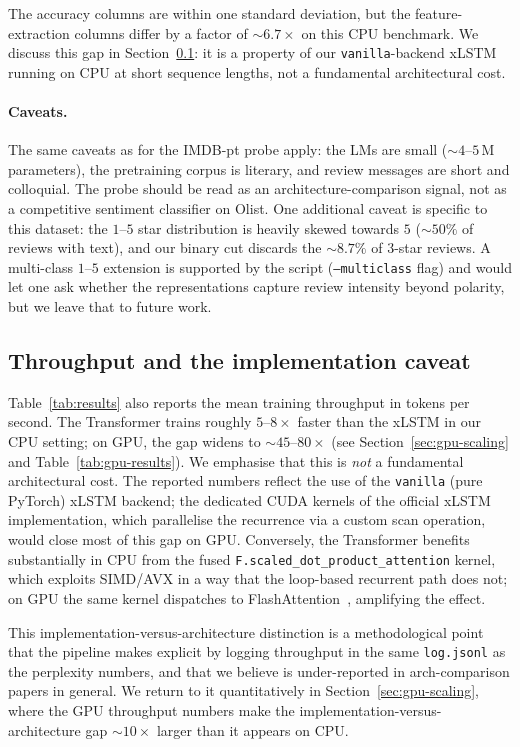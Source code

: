 \documentclass[11pt]{article}
\begin{document}
The accuracy columns are within one standard deviation, but the
feature-extraction columns differ by a factor of $\sim$$6.7\times$ on
this CPU benchmark. We discuss this gap in
Section~\ref{sec:throughput}: it is a property of our
\texttt{vanilla}-backend xLSTM running on CPU at short sequence
lengths, not a fundamental architectural cost.

\paragraph{Caveats.}
The same caveats as for the IMDB-pt probe apply: the LMs are small
($\sim$$4$--$5$\,M parameters), the pretraining corpus is literary,
and review messages are short and colloquial. The probe should be
read as an architecture-comparison signal, not as a competitive
sentiment classifier on Olist. One additional caveat is specific to
this dataset: the $1$--$5$ star distribution is heavily skewed
towards $5$ ($\sim$$50\%$ of reviews with text), and our binary cut
discards the $\sim$$8.7\%$ of $3$-star reviews. A multi-class
$1$--$5$ extension is supported by the script (\texttt{--multiclass}
flag) and would let one ask whether the representations capture
review intensity beyond polarity, but we leave that to future work.

\subsection{Throughput and the implementation caveat}\label{sec:throughput}

Table~\ref{tab:results} also reports the mean training throughput in
tokens per second. The Transformer trains roughly $5$--$8\times$ faster
than the xLSTM in our CPU setting; on GPU, the gap widens to
$\sim$$45$--$80\times$ (see Section~\ref{sec:gpu-scaling} and
Table~\ref{tab:gpu-results}). We emphasise that this is \emph{not} a
fundamental architectural cost. The reported numbers reflect the use of
the \texttt{vanilla} (pure PyTorch) xLSTM backend; the dedicated CUDA
kernels of the official xLSTM implementation, which parallelise the
recurrence via a custom scan operation, would close most of this gap on
GPU. Conversely, the Transformer benefits substantially in CPU from the
fused \texttt{F.scaled\_dot\_product\_attention} kernel, which exploits
SIMD/AVX in a way that the loop-based recurrent path does not; on GPU
the same kernel dispatches to FlashAttention~\cite{dao2022flashattention},
amplifying the effect.

This implementation-versus-architecture distinction is a methodological
point that the pipeline makes explicit by logging throughput in the same
\texttt{log.jsonl} as the perplexity numbers, and that we believe is
under-reported in arch-comparison papers in general. We return to it
quantitatively in Section~\ref{sec:gpu-scaling}, where the GPU
throughput numbers make the implementation-versus-architecture gap
$\sim$$10\times$ larger than it appears on CPU.
\end{document}
